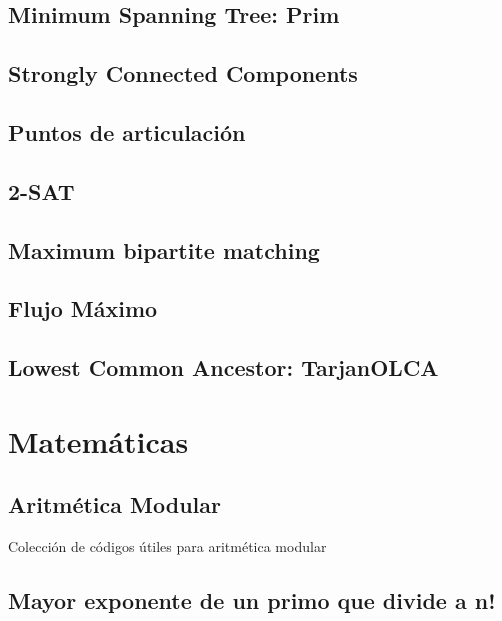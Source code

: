 \documentclass[10pt,letterpaper,twocolumn,twosided]{article}
\newcommand{\codigofuente}[1]{

\dotfill
}
\begin{document}
\subsection{Minimum Spanning Tree: Prim}

\subsection{Strongly Connected Components}

\subsection{Puntos de articulación}

\subsection{2-SAT}

\subsection{Maximum bipartite matching}

\subsection{Flujo Máximo}

\subsection{Lowest Common Ancestor: TarjanOLCA}

\section{Matemáticas}

\subsection{Aritmética Modular}

Colección de códigos útiles para aritmética modular\\
\codigofuente{../src/euclidean.${EXT}}

\subsection{Mayor exponente de un primo que divide a n!}
\codigofuente{../src/mate/pow_div.${EXT}}
\end{document}
